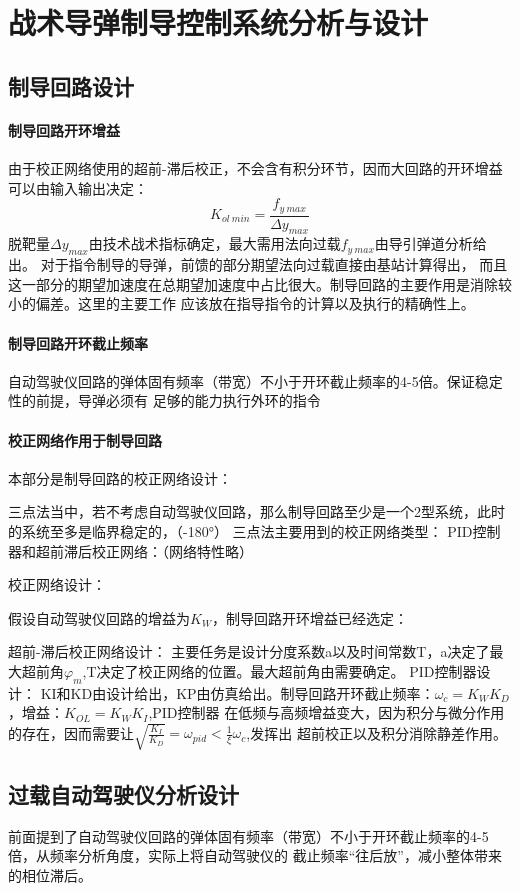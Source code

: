 \chapter{战术导弹制导控制系统分析与设计}
\section{制导回路设计}
\subsubsection{制导回路开环增益}
由于校正网络使用的超前-滞后校正，不会含有积分环节，因而大回路的开环增益可以由输入输出决定：
$$K_{ol\ min}=\frac{f_{y\ max}}{\Delta y_{max}}$$
脱靶量$\Delta y_{max}$由技术战术指标确定，最大需用法向过载$f_{y\ max}$由导引弹道分析给出。
对于指令制导的导弹，前馈的部分期望法向过载直接由基站计算得出，
而且这一部分的期望加速度在总期望加速度中占比很大。制导回路的主要作用是消除较小的偏差。这里的主要工作
应该放在指导指令的计算以及执行的精确性上。
\subsubsection{制导回路开环截止频率}
自动驾驶仪回路的弹体固有频率（带宽）不小于开环截止频率的4-5倍。保证稳定性的前提，{\kaishu 导弹必须有
足够的能力执行外环的指令}
\subsubsection{校正网络作用于制导回路}
本部分是制导回路的校正网络设计：

三点法当中，若不考虑自动驾驶仪回路，那么制导回路至少是一个2型系统，此时的系统至多是临界稳定的，（-180°）
三点法主要用到的校正网络类型：
PID控制器和超前滞后校正网络：（网络特性略）

{\heiti 校正网络设计：}

假设自动驾驶仪回路的增益为$K_W$，制导回路开环增益已经选定：

超前-滞后校正网络设计：
主要任务是设计分度系数a以及时间常数T，a决定了最大超前角$\varphi_m$,T决定了校正网络的位置。最大超前角由需要确定。
PID控制器设计：
KI和KD由设计给出，KP由仿真给出。制导回路开环截止频率：$\omega_c = K_WK_D$，增益：$K_{OL}=K_WK_I$,PID控制器
在低频与高频增益变大，因为积分与微分作用的存在，因而需要让$\sqrt{\frac{K_I}{K_D}}=\omega_{pid} < \frac{1}{\xi}\omega_c$,发挥出
超前校正以及积分消除静差作用。
\section{过载自动驾驶仪分析设计}
前面提到了自动驾驶仪回路的弹体固有频率（带宽）不小于开环截止频率的4-5倍，从频率分析角度，实际上将自动驾驶仪的
截止频率“往后放”，减小整体带来的相位滞后。

